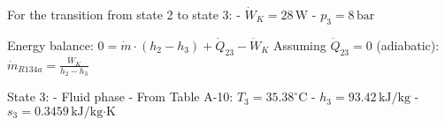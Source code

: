 For the transition from state 2 to state 3:  
- \( \dot{W}_K = 28 \, \text{W} \)  
- \( p_3 = 8 \, \text{bar} \)  

Energy balance:  
\( 0 = \dot{m} \cdot (h_2 - h_3) + \dot{Q}_{23} - \dot{W}_K \)  
Assuming \( \dot{Q}_{23} = 0 \) (adiabatic):  
\( \dot{m}_{R134a} = \frac{\dot{W}_K}{h_2 - h_3} \)  

State 3:  
- Fluid phase  
- From Table A-10: \( T_3 = 35.38^\circ \text{C} \)  
- \( h_3 = 93.42 \, \text{kJ/kg} \)  
- \( s_3 = 0.3459 \, \text{kJ/kg·K} \)
